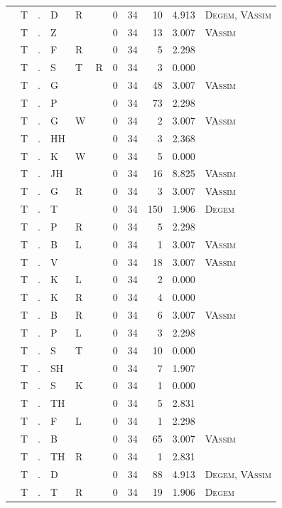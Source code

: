 \documentclass[12pt]{article}
\begin{document}
\begin{longtable}{r@{ } r@{ } c@{ } l@{ } l@{ } l@{ } r r r r l }
 & T & . & D & R &  & 0 & 34 & 10 & 4.913 & \textsc{Degem}, \textsc{VAssim} \\
 & T & . & Z &  &  & 0 & 34 & 13 & 3.007 & \textsc{VAssim} \\
 & T & . & F & R &  & 0 & 34 & 5 & 2.298 &  \\
 & T & . & S & T & R & 0 & 34 & 3 & 0.000 &  \\
 & T & . & G &  &  & 0 & 34 & 48 & 3.007 & \textsc{VAssim} \\
 & T & . & P &  &  & 0 & 34 & 73 & 2.298 &  \\
 & T & . & G & W &  & 0 & 34 & 2 & 3.007 & \textsc{VAssim} \\
 & T & . & HH &  &  & 0 & 34 & 3 & 2.368 &  \\
 & T & . & K & W &  & 0 & 34 & 5 & 0.000 &  \\
 & T & . & JH &  &  & 0 & 34 & 16 & 8.825 & \textsc{VAssim} \\
 & T & . & G & R &  & 0 & 34 & 3 & 3.007 & \textsc{VAssim} \\
 & T & . & T &  &  & 0 & 34 & 150 & 1.906 & \textsc{Degem} \\
 & T & . & P & R &  & 0 & 34 & 5 & 2.298 &  \\
 & T & . & B & L &  & 0 & 34 & 1 & 3.007 & \textsc{VAssim} \\
 & T & . & V &  &  & 0 & 34 & 18 & 3.007 & \textsc{VAssim} \\
 & T & . & K & L &  & 0 & 34 & 2 & 0.000 &  \\
 & T & . & K & R &  & 0 & 34 & 4 & 0.000 &  \\
 & T & . & B & R &  & 0 & 34 & 6 & 3.007 & \textsc{VAssim} \\
 & T & . & P & L &  & 0 & 34 & 3 & 2.298 &  \\
 & T & . & S & T &  & 0 & 34 & 10 & 0.000 &  \\
 & T & . & SH &  &  & 0 & 34 & 7 & 1.907 &  \\
 & T & . & S & K &  & 0 & 34 & 1 & 0.000 &  \\
 & T & . & TH &  &  & 0 & 34 & 5 & 2.831 &  \\
 & T & . & F & L &  & 0 & 34 & 1 & 2.298 &  \\
 & T & . & B &  &  & 0 & 34 & 65 & 3.007 & \textsc{VAssim} \\
 & T & . & TH & R &  & 0 & 34 & 1 & 2.831 &  \\
 & T & . & D &  &  & 0 & 34 & 88 & 4.913 & \textsc{Degem}, \textsc{VAssim} \\
 & T & . & T & R &  & 0 & 34 & 19 & 1.906 & \textsc{Degem} \\

\end{longtable}
\end{document}
